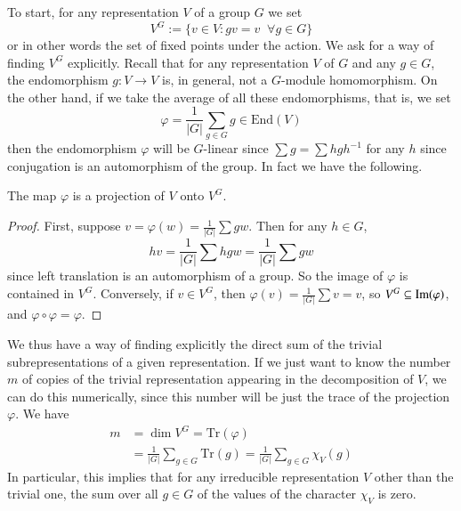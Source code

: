 To start, for any representation $V$ of a group $G$ we set \begin{equation*}
    V^G := \{v \in V:gv = v\;\;\forall g \in G\}
\end{equation*}
or in other words the set of fixed points under the action. We ask for a way of finding $V^G$ explicitly. Recall that for any representation $V$ of $G$ and any $g \in G$, the endomorphism $g:V\rightarrow V$ is, in general, not a $G$-module homomorphism. On the other hand, if we take the average of all these endomorphisms, that is, we set \begin{equation*}
    \varphi = \frac{1}{|G|}\sum_{g\in G}g \in \text{End}(V)
\end{equation*}
then the endomorphism $\varphi$ will be $G$-linear since $\sum g = \sum hgh^{-1}$ for any $h$ since conjugation is an automorphism of the group. In fact we have the following.

\begin{proposition}
    The map $\varphi$ is a projection of $V$ onto $V^G$.
\end{proposition}
\begin{proof}
    First, suppose $v = \varphi(w) = \frac{1}{|G|}\sum gw$. Then for any $h \in G$, $$hv = \frac{1}{|G|}\sum hgw = \frac{1}{|G|}\sum gw$$
    since left translation is an automorphism of a group. So the image of $\varphi$ is contained in $V^G$. Conversely, if $v \in V^G$, then $\varphi(v) = \frac{1}{|G|}\sum v = v$, so $V^G \subseteq \operatorname{Im}(\varphi)$, and $\varphi \circ \varphi = \varphi$.
\end{proof}
We thus have a way of finding explicitly the direct sum of the trivial subrepresentations of a given representation. If we just want to know the number $m$ of copies of the trivial representation appearing in the decomposition of $V$, we can do this numerically, since this number will be just the trace of the projection $\varphi$. We have \begin{align*}
    m &= \dim V^G = \text{Tr}(\varphi) \\
    &= \frac{1}{|G|}\sum_{g \in G}\text{Tr}(g) = \frac{1}{|G|}\sum_{g \in G}\chi_V(g)
\end{align*}
In particular, this implies that for any irreducible representation $V$ other than the trivial one, the sum over all $g \in G$ of the values of the character $\chi_V$ is zero.

